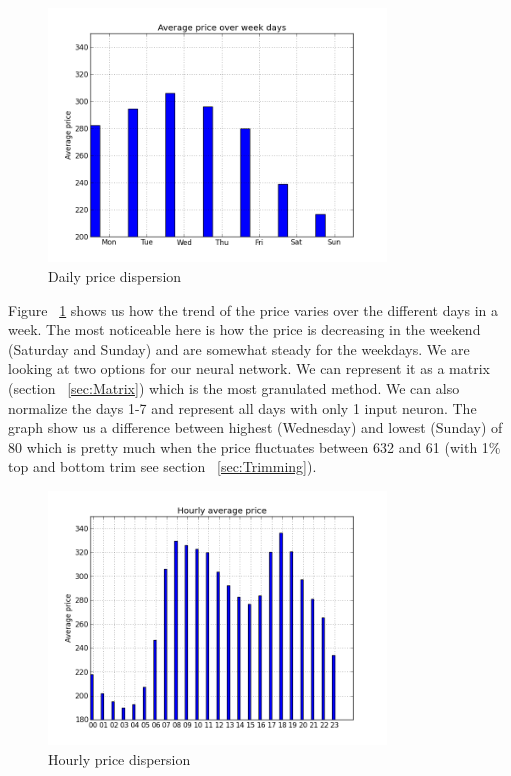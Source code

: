 \begin{figure}[H]
\centering
\includegraphics[width=0.8\textwidth ,natwidth=410,natheight=237]{billeder/energy_price_plots/Average_price_over_weekdays.png}
\caption{Daily price dispersion}
\label{fig:price_over_weekdays}
\end{figure}

Figure ~\ref{fig:price_over_weekdays} shows us how the trend of the price varies over the different days in a week. The most noticeable here is how the price is decreasing in the weekend (Saturday and Sunday) and are somewhat steady for the weekdays. We are looking at two options for our neural network. We can represent it as a matrix (section ~\ref{sec:Matrix}) which is the most granulated method. We can also normalize the days 1-7 and represent all days with only 1 input neuron.
The graph show us a difference between highest (Wednesday) and lowest (Sunday) of 80 which is pretty much when the price fluctuates between 632 and 61 (with 1\% top and bottom trim see section ~\ref{sec:Trimming}).

\begin{figure}[H]
\centering
\includegraphics[width=0.8\textwidth ,natwidth=410,natheight=237]{billeder/energy_price_plots/price_per_hour.png}
\caption{Hourly price dispersion}
\label{fig:price_per_hour}
\end{figure}

